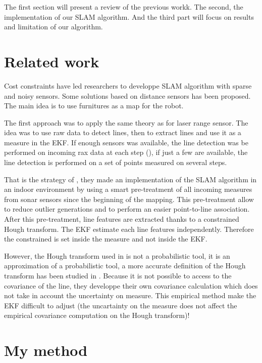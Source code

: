 \documentclass[a4paper,12pt]{article}
\begin{document}
The first section will present a review of the previous workk. The second, the implementation of our SLAM algorithm. And the third part will focus on results and limitation of our algorithm.

\section{Related work}
\label{sec:relwork}

Cost constraints have led researchers to developpe SLAM algorithm with sparse and noisy sensors.
Some solutions based on distance sensors has been proposed.
The main idea is to use furnitures as a map for the robot.

The first approach was to apply the same theory as for laser range sensor.
The idea was to use raw data to detect lines, then to extract lines and use it as a measure in the EKF.
If enough sensors was available, the line detection was be performed on incoming rax data at each step (\cite{grossmann2001robust}), if just a few are available, the line detection is performed on a set of points measured on several steps.

That is the strategy of \cite{choi2008line}, they made an implementation of the SLAM algorithm in an indoor environment by using a smart pre-treatment of all incoming measures from sonar sensors since the beginning of the mapping. This pre-treatment allow to reduce outlier generations and to perform an easier point-to-line association.
After this pre-treatment, line features are extracted thanks to a constrained Hough transform. The EKF estimate each line features independently.
Therefore the constrained is set inside the measure and not inside the EKF.

However, the Hough transform used in \cite{choi2008line} is not a probabilistic tool, it is an approximation of a probabilistic tool, a more accurate definition of the Hough transform has been studied in \cite{stephens1991probabilistic}. Because it is not possible to access to the covariance of the line, they developpe their own covariance calculation which does not take in account the uncertainty on measure.
This empirical method make the EKF difficult to adjust (the uncartainty on the measure does not affect the empirical covariance computation on the Hough transform)!



\section{My method}
\label{sec:method}
\end{document}
